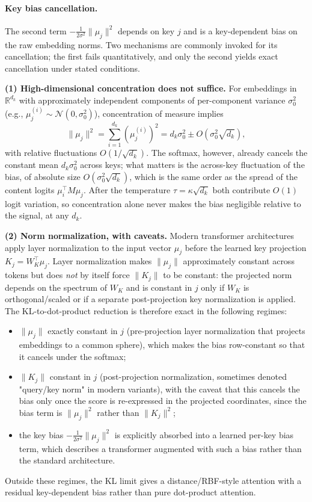 \documentclass[11pt]{article}
\begin{document}
\paragraph{Key bias cancellation.}
The second term $-\frac{1}{2\sigma^2}\|\mu_j\|^2$ depends on key $j$ and is a key-dependent bias on the raw embedding norms. Two mechanisms are commonly invoked for its cancellation; the first fails quantitatively, and only the second yields exact cancellation under stated conditions.

\textbf{(1) High-dimensional concentration does not suffice.}
For embeddings in $\mathbb{R}^{d_k}$ with approximately independent components of per-component variance $\sigma_0^2$ (e.g., $\mu_j^{(i)} \sim \mathcal{N}(0, \sigma_0^2)$), concentration of measure implies
\begin{equation}
\|\mu_j\|^2 = \sum_{i=1}^{d_k} (\mu_j^{(i)})^2 = d_k\sigma_0^2 \pm O(\sigma_0^2\sqrt{d_k}),
\end{equation}
with relative fluctuations $O(1/\sqrt{d_k})$. The softmax, however, already cancels the constant mean $d_k\sigma_0^2$ across keys; what matters is the across-key fluctuation of the bias, of absolute size $O(\sigma_0^2\sqrt{d_k})$, which is the same order as the spread of the content logits $\mu_i^\top M\mu_j$. After the temperature $\tau = \kappa\sqrt{d_k}$ both contribute $O(1)$ logit variation, so concentration alone never makes the bias negligible relative to the signal, at any $d_k$.

\textbf{(2) Norm normalization, with caveats.}
Modern transformer architectures apply layer normalization to the input vector $\mu_j$ before the learned key projection $K_j = W_K^\top \mu_j$. Layer normalization makes $\|\mu_j\|$ approximately constant across tokens but does \emph{not} by itself force $\|K_j\|$ to be constant: the projected norm depends on the spectrum of $W_K$ and is constant in $j$ only if $W_K$ is orthogonal/scaled or if a separate post-projection key normalization is applied. The KL-to-dot-product reduction is therefore exact in the following regimes:
\begin{itemize}
\item $\|\mu_j\|$ exactly constant in $j$ (pre-projection layer normalization that projects embeddings to a common sphere), which makes the bias row-constant so that it cancels under the softmax;
\item $\|K_j\|$ constant in $j$ (post-projection normalization, sometimes denoted "query/key norm" in modern variants), with the caveat that this cancels the bias only once the score is re-expressed in the projected coordinates, since the bias term is $\|\mu_j\|^2$ rather than $\|K_j\|^2$;
\item the key bias $-\tfrac{1}{2\sigma^2}\|\mu_j\|^2$ is explicitly absorbed into a learned per-key bias term, which describes a transformer augmented with such a bias rather than the standard architecture.
\end{itemize}
Outside these regimes, the KL limit gives a distance/RBF-style attention with a residual key-dependent bias rather than pure dot-product attention.
\end{document}
